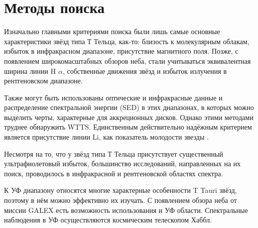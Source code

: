

\section{Методы поиска}
 Изначально главными критериями поиска были лишь самые основные характеристики звёзд типа Т Тельца, как-то: близость к молекулярным облакам, избыток в инфракрасном диапазоне, присутствие магнитного поля. Позже, с появлением широкомасштабных обзоров неба, стали учитываться эквивалентная ширина линии H $\alpha$, собственные движения звёзд и избыток излучения в рентгеновском диапазоне.

Также могут быть использованы оптические и инфракрасные данные и распределение спектральной энергии (SED) в этих диапазонах, в которых можно выделить черты, характерные для аккреционных дисков. Однако этими методами труднее обнаружить WTTS. Единственным действительно надёжным критерием является присутствие линии Li, как показатель молодости звезды \cite{dod2013}.

Несмотря на то, что у звёзд типа Т Тельца присутствует существенный ультрафиолетовый избыток, большинство исследований, направленных на их поиск, проводилось в инфракрасной и рентгеновской областях спектра. 

К УФ диапазону относятся многие характерные особенности T Tauri звёзд, поэтому в нём можно эффективно их изучать. С появлением обзора неба от миссии GALEX есть возможность использования и УФ области. Спектральные наблюдения в УФ осуществляются космическим телескопом Хаббл.



